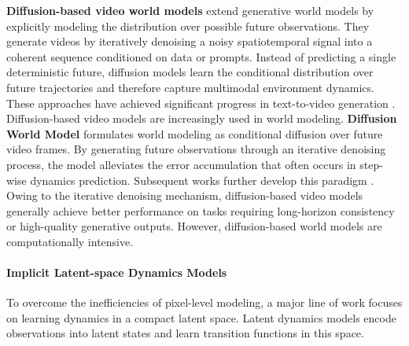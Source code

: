 \textbf{Diffusion-based video world models} extend generative world models by explicitly modeling the distribution over possible future observations. They generate videos by iteratively denoising a noisy spatiotemporal signal into a coherent sequence conditioned on data or prompts. Instead of predicting a single deterministic future, diffusion models learn the conditional distribution over future trajectories and therefore capture multimodal environment dynamics. These approaches have achieved significant progress in text-to-video generation \cite{Video_Diffusion_Model, Stable_Video_Diffusion}. Diffusion-based video models are increasingly used in world modeling. \textbf{Diffusion World Model} \cite{DiffusionWorldModel} formulates world modeling as conditional diffusion over future video frames. By generating future observations through an iterative denoising process, the model alleviates the error accumulation that often occurs in step-wise dynamics prediction. Subsequent works further develop this paradigm \cite{UWM, Inference-Time_Enhancement, FlowDreamer, EnerVerse, Cosmos-Transfer1, DIAMOND, GameNGen, PEVA}. Owing to the iterative denoising mechanism, diffusion-based video models generally achieve better performance on tasks requiring long-horizon consistency or high-quality generative outputs. However, diffusion-based world models are computationally intensive.

\paragraph{Implicit Latent-space Dynamics Models}

To overcome the inefficiencies of pixel-level modeling, a major line of work focuses on learning dynamics in a compact latent space. Latent dynamics models encode observations into latent states and learn transition functions in this space.

